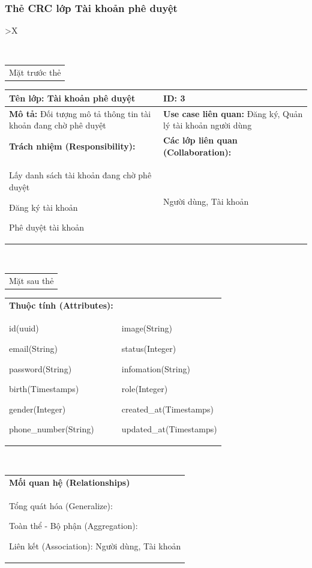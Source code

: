 \subsubsection{Thẻ CRC lớp Tài khoản phê duyệt}
  \begin{xltabular}{\textwidth}{
    >{\centering\arraybackslash}X 
  }
  \newpage
  \caption{\bfseries \fontsize{12pt}{0pt}\selectfont Thẻ CRC lớp Tài khoản phê duyệt}
  \\
  \begin{tabularx}{0.9\textwidth}{X}
    Mặt trước thẻ
  \end{tabularx}
  \begin{tabularx}{0.9\textwidth}{|X|X|}
    \hline
    \textbf{Tên lớp:} Tài khoản phê duyệt & \textbf{ID:} 3 \\
    \hline
    \textbf{Mô tả:} Đối tượng mô tả thông tin tài khoản đang chờ phê duyệt & \textbf{Use case liên quan:} Đăng ký, Quản lý tài khoản người dùng \\
    \hline
    \textbf{Trách nhiệm (Responsibility):} & \textbf{Các lớp liên quan (Collaboration):} \\
    Lấy danh sách tài khoản đang chờ phê duyệt
    
    Đăng ký tài khoản

    Phê duyệt tài khoản
    & 
    Người dùng, Tài khoản
    \\
    \hline
  \end{tabularx}
  \\ 
  \begin{tabularx}{0.9\textwidth}{X}
    Mặt sau thẻ
  \end{tabularx}
  \begin{tabularx}{0.9\textwidth}{|X|X|}
    \hline
    \textbf{Thuộc tính (Attributes):} & \\
    id(uuid) 
    
    email(String)

    password(String)

    birth(Timestamps)

    gender(Integer)

    phone\_number(String)
    &
    image(String)

    status(Integer)

    infomation(String)

    role(Integer)

    created\_at(Timestamps)

    updated\_at(Timestamps)
    \\
    \hline
  \end{tabularx}
  \\     
  \begin{tabularx}{0.9\textwidth}{|X|}
    \textbf{Mối quan hệ (Relationships)} \\
    Tổng quát hóa (Generalize):  

    Toàn thể - Bộ phận (Aggregation):   
      
    Liên kết (Association): Người dùng, Tài khoản
    \\
    \hline
  \end{tabularx}
  \end{xltabular}

